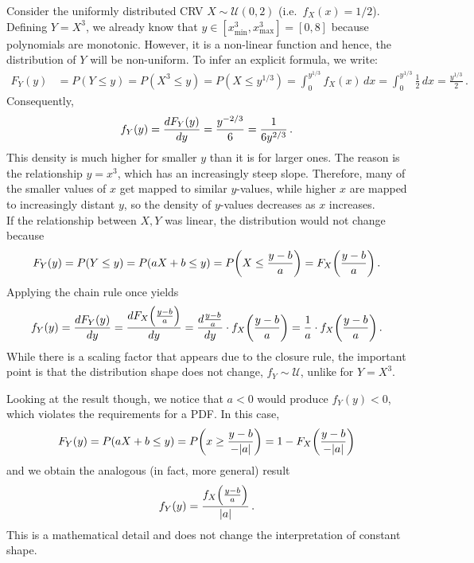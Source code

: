\begin{ex}\label{ex:non_lin_vs_lin_1}
Consider the uniformly distributed CRV $X \sim \mathcal{U}(0, 2)$ (i.e.~$f_X(x) = 1 / 2$). Defining $Y = X^3$, we already know that $y \in [x_\text{min}^3, x_\text{max}^3] = [0, 8]$ because polynomials are monotonic. However, it is a non-linear function and hence, the distribution of $Y$ will be non-uniform. To infer an explicit formula, we write:
\begin{align*}
F_Y(y) &= P(Y \leq y) = P(X^3 \leq y) = P(X \leq y^{1 / 3}) = \int_0^{y^{1 / 3}} f_X(x) \, dx = \int_0^{y^{1 / 3}} \frac{1}{2} \, dx = \frac{y^{1 / 3}}{2} \, .
\end{align*}
Consequently,
\begin{equation*}
f_Y(y) = \dv{F_Y(y)}{y} = \frac{y^{- 2 / 3}}{6} = \frac{1}{6 y^{2 / 3}} \, .
\end{equation*}
This density is much higher for smaller $y$ than it is for larger ones. The reason is the relationship $y = x^3$, which has an increasingly steep slope. Therefore, many of the smaller values of $x$ get mapped to similar $y$-values, while higher $x$ are mapped to increasingly distant $y$, so the density of $y$-values decreases as $x$ increases.\\


If the relationship between $X, Y$ was linear, the distribution would not change because
\begin{equation*}
F_Y(y) = P(Y \leq y) = P(a X + b \leq y) = P\qty(X \leq \frac{y - b}{a}) = F_X\qty(\frac{y - b}{a}) \, .
\end{equation*}
Applying the chain rule once yields
\begin{equation*}
f_Y(y) = \dv{F_Y(y)}{y} = \dv{F_X\qty(\frac{y - b}{a})}{y} = \dv{\frac{y - b}{a}}{y} \cdot f_X\qty(\frac{y - b}{a}) = \frac{1}{a} \cdot f_X\qty(\frac{y - b}{a}) \, .%
\end{equation*}
While there is a scaling factor that appears due to the closure rule, the important point is that the distribution shape does not change, $f_Y \sim \mathcal{U}$, unlike for $Y = X^3$.

Looking at the result though, we notice that $a < 0$ would produce $f_Y(y) < 0$, which violates the requirements for a PDF. In this case,
\begin{equation*}
F_Y(y) = P(a X + b \leq y) = P\qty(x \geq \frac{y - b}{- \abs{a}}) = 1 - F_X\qty(\frac{y - b}{- \abs{a}})
\end{equation*}
and we obtain the analogous (in fact, more general) result
\begin{equation*}
f_Y(y) = \frac{f_X\qty(\frac{y - b}{a})}{\abs{a}} \, .
\end{equation*}
This is a mathematical detail and does not change the interpretation of constant shape.

\end{ex}


